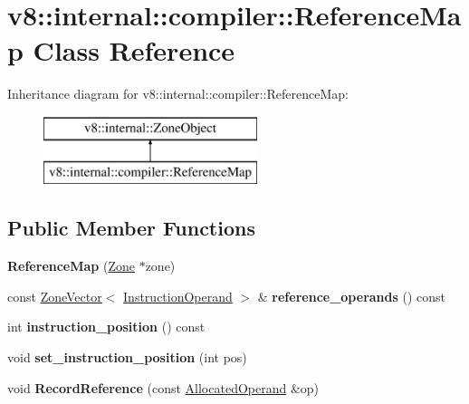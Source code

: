 \hypertarget{classv8_1_1internal_1_1compiler_1_1_reference_map}{}\section{v8\+:\+:internal\+:\+:compiler\+:\+:Reference\+Map Class Reference}
\label{classv8_1_1internal_1_1compiler_1_1_reference_map}
Inheritance diagram for v8\+:\+:internal\+:\+:compiler\+:\+:Reference\+Map\+:\begin{figure}[H]
\begin{center}
\leavevmode
\includegraphics[height=2.000000cm]{classv8_1_1internal_1_1compiler_1_1_reference_map}
\end{center}
\end{figure}
\subsection*{Public Member Functions}
\begin{DoxyCompactItemize}
\item 
{\bfseries Reference\+Map} (\hyperlink{classv8_1_1internal_1_1_zone}{Zone} $\ast$zone)\hypertarget{classv8_1_1internal_1_1compiler_1_1_reference_map_a27b779e91f24cb93781104a08321e733}{}\label{classv8_1_1internal_1_1compiler_1_1_reference_map_a27b779e91f24cb93781104a08321e733}

\item 
const \hyperlink{classv8_1_1internal_1_1_zone_vector}{Zone\+Vector}$<$ \hyperlink{classv8_1_1internal_1_1compiler_1_1_instruction_operand}{Instruction\+Operand} $>$ \& {\bfseries reference\+\_\+operands} () const \hypertarget{classv8_1_1internal_1_1compiler_1_1_reference_map_ae33f60131edf61d5743421fc6767cde4}{}\label{classv8_1_1internal_1_1compiler_1_1_reference_map_ae33f60131edf61d5743421fc6767cde4}

\item 
int {\bfseries instruction\+\_\+position} () const \hypertarget{classv8_1_1internal_1_1compiler_1_1_reference_map_aa1f1fce69f92213dd290738c1cd562e6}{}\label{classv8_1_1internal_1_1compiler_1_1_reference_map_aa1f1fce69f92213dd290738c1cd562e6}

\item 
void {\bfseries set\+\_\+instruction\+\_\+position} (int pos)\hypertarget{classv8_1_1internal_1_1compiler_1_1_reference_map_a71a728f68f4e3a4bb12132d7a19062e6}{}\label{classv8_1_1internal_1_1compiler_1_1_reference_map_a71a728f68f4e3a4bb12132d7a19062e6}

\item 
void {\bfseries Record\+Reference} (const \hyperlink{classv8_1_1internal_1_1compiler_1_1_allocated_operand}{Allocated\+Operand} \&op)\hypertarget{classv8_1_1internal_1_1compiler_1_1_reference_map_a5b72412d4b714cce3d38e65eab31f40e}{}\label{classv8_1_1internal_1_1compiler_1_1_reference_map_a5b72412d4b714cce3d38e65eab31f40e}

\end{DoxyCompactItemize}
